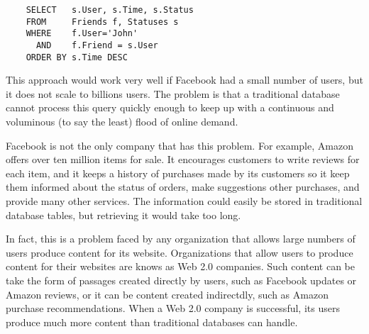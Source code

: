 \begin{verbatim}
	SELECT   s.User, s.Time, s.Status
	FROM     Friends f, Statuses s
	WHERE    f.User='John'
	  AND    f.Friend = s.User
	ORDER BY s.Time DESC
\end{verbatim}

This approach would work very well if Facebook had a small number of users,
but it does not scale to billions users.
The problem is that a traditional database cannot process
this query quickly enough to keep up with a continuous
and voluminous (to say the least) flood of online demand.

Facebook is not the only company that has this problem.
For example, Amazon offers over ten million items for sale.
It encourages customers to write reviews for each item, and it keeps a history
of purchases made by its customers so it keep them informed about the status of orders,
make suggestions other purchases, and provide many other services.
The information could easily be stored in traditional database tables,
but retrieving it would take too long.

In fact, this is a problem faced by any organization that
allows large numbers of users produce content for its website.
Organizations that allow users to produce content for their websites
are knows as Web 2.0 companies.
Such content can be take the form of passages created directly by users,
such as Facebook updates or Amazon reviews, or it can be content created
indirectdly, such as Amazon purchase recommendations.
When a Web 2.0 company is successful,
its users produce much more content than traditional databases can handle.

